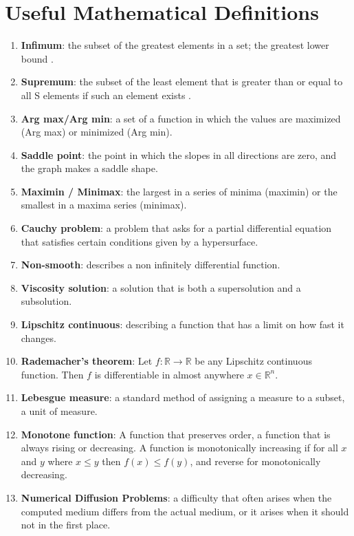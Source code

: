 \documentclass[11pt]{amsart}
\begin{document}
\section{Useful Mathematical Definitions}\label{mathdefs}
\begin{enumerate}
    \item\label{math:infimum} \textbf{Infimum}: the subset of the greatest elements in a set; the greatest lower bound \cite{infimumsupremum}.
    \item\label{math:supremum} \textbf{Supremum}: the subset of the least element that is greater than or equal to all S elements if such an element exists  \cite{infimumsupremum}.
    \item\label{math:Argmaxmin} \textbf{Arg max/Arg min}: a set of a function in which the values are maximized (Arg max) or minimized (Arg min).
    \item\label{math:saddlepoint} \textbf{Saddle point}: the point in which the slopes in all directions are zero, and the graph makes a saddle shape.
    \item\label{math:maximinminimax} \textbf{Maximin / Minimax}: the largest in a series of minima (maximin) or the smallest in a maxima series (minimax).
    \item\label{math:cauchyproblem} \textbf{Cauchy problem}: a problem that asks for a partial differential equation that satisfies certain conditions given by a hypersurface.
    \item\label{math:nonsmooth} \textbf{Non-smooth}: describes a non infinitely differential function.
    \item\label{math:viscosity} \textbf{Viscosity solution}: a solution that is both a supersolution and a subsolution.
    \item\label{math:lipschitz} \textbf{Lipschitz continuous}: describing a function that has a limit on how fast it changes.
    \item\label{math:rademacher} \textbf{Rademacher's theorem}: Let $f: \mathbb{R} \rightarrow \mathbb{R} $ be any Lipschitz continuous function. Then $f$ is differentiable in almost anywhere $x \in \mathbb{R}^n$.
    \item\label{math:lebesgue} \textbf{Lebesgue measure}: a standard method of assigning a measure to a subset, a unit of measure.
    \item\label{math:monotone} \textbf{Monotone function}: A function that preserves order, a function that is always rising or decreasing. A function is monotonically increasing if for all $x$ and $y$ where $x \leq y$ then $f(x) \leq f(y)$, and reverse for monotonically decreasing.
    \item\label{math:diffusionproblem} \textbf{Numerical Diffusion Problems}: a difficulty that often arises when the computed medium differs from the actual medium, or it arises when it should not in the first place.
\end{enumerate}
\end{document}
